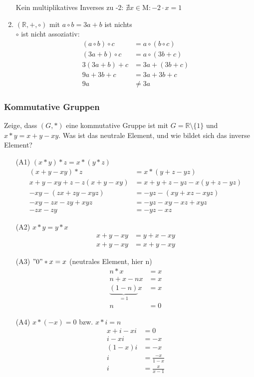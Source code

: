 \documentclass[11pt, a4paper]{article}
\begin{document}
\begin{enumerate}
	Kein multiplikatives Inverses zu -2: $\nexists x \in \mathrm{M}: -2 \cdot x = 1$
	\item $\left( \mathbb{R}, +, \circ \right)$ mit $a \circ b = 3a + b$ ist nichts \\
	$\circ$ ist nicht assoziativ:
	\begin{align*}
		(a \circ b) \circ c &= a \circ (b \circ c) \\
		(3a + b) \circ c &= a \circ (3b + c) \\
		3(3a + b) + c &= 3a + (3b + c) \\
		9a + 3b + c &= 3a + 3b + c \\
		9a &\neq 3a
	\end{align*}
\end{enumerate}

\subsubsection{Kommutative Gruppen}
Zeige, dass $(G,*)$ eine kommutative Gruppe ist mit $G=\mathbb{R} \setminus \{1\}$ und $x * y = x+y-xy$. Was ist das neutrale Element, und wie bildet sich das inverse Element?
\begin{enumerate}
	\item[(A1)] $(x * y) * z = x * (y * z)$
		\begin{align*}
			(x+y-xy) * z &= x * (y+z-yz) \\
			x+y-xy + z - z(x+y-xy) &= x+ y+z-yz - x(y+z-yz) \tag*{$-x-y-z$} \\
			-xy - (zx+zy-xyz)&= -yz - (xy+xz-xyz) \\
			-xy - zx - zy + xyz &= -yz - xy - xz + xyz \tag*{- xyz + xy} \\
			- zx - zy &= -yz - xz \tag*{sichtbar gleich}
		\end{align*}
	\item[(A2)] $x * y = y * x$
		\begin{align*}
			x+y-xy &= y+x-xy \\
			x+y-xy &= x+y-xy
		\end{align*}
	\item[(A3)] $"0" * x = x$ (neutrales Element, hier n)
		\begin{align*}
			n * x &= x \\
			n+x-nx &= x \\
			\underbrace{(1-n)}_{=1}x &= x \\
			n &= 0
		\end{align*}
	\item[(A4)] $x * (-x) = 0$ bzw. $x * i = n$
		\begin{align*}
			x + i - xi &= 0 \\
			i - xi &= -x \\
			(1-x)i &= -x \\
			i &= \frac{-x}{1-x} \tag*{$1 \notin G$} \\
			i &= \frac{x}{x-1}
		\end{align*}
\end{enumerate}
\end{document}
